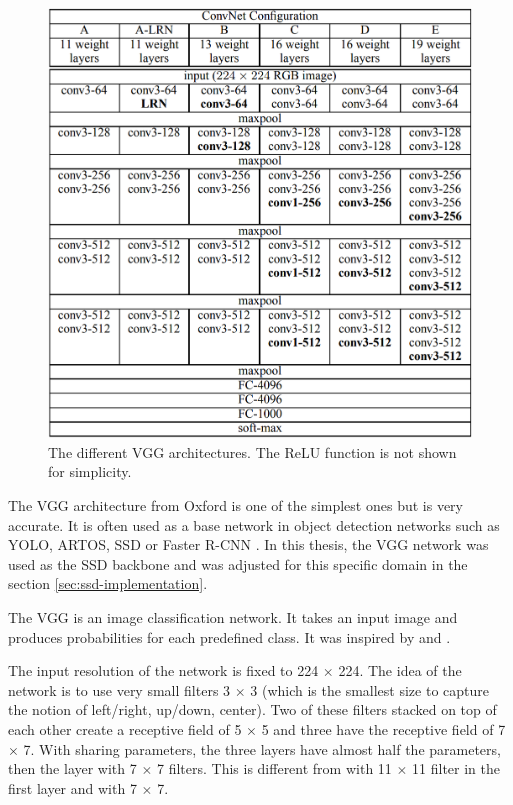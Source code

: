 \documentclass[a4paper,11pt,titlepage,twoside]{article}
\numberwithin{figure}{section}
\begin{document}
\begin{figure}[h!]
\centering
\includegraphics[width=1\linewidth]{fig/vgg.png}
\caption{The different VGG architectures. The ReLU function is not shown for simplicity. \cite{simonyan2014very}}
\label{fig:vgg}
\end{figure}

The VGG\cite{simonyan2014very} architecture from Oxford is one of the simplest ones but is very accurate. It is often used as a base network in object detection networks such as YOLO\cite{redmon2016you}, ARTOS\cite{barz2017fast}, SSD \cite{liu2016ssd} or Faster R-CNN \cite{faster-rcnn}. In this thesis, the VGG network was used as the SSD backbone and was adjusted for this specific domain in the section \ref{sec:ssd-implementation}. 

The VGG is an image classification network. It takes an input image and produces probabilities for each predefined class. It was inspired by \cite{ciresan2011flexible} and \cite{krizhevsky2012imagenet}.

The input resolution of the network is fixed to 224 $\times$ 224. The idea of the network is to use very small filters 3 $\times$ 3  (which is the smallest size to capture the notion of left/right, up/down, center)\cite{simonyan2014very}. Two of these filters stacked on top of each other create a receptive field of 5 $\times$ 5 and three have the receptive field of 7 $\times$ 7. With sharing parameters, the three layers have almost half the parameters, then the layer with 7 $\times$ 7 filters. This is different from \cite{krizhevsky2012imagenet} with 11 $\times$ 11 filter in the first layer and \cite{zeiler2014visualizing} with 7 $\times$ 7.
\end{document}
